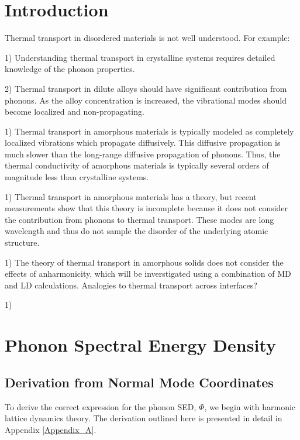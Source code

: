 \documentclass[letterpaper,12pt]{article}
\begin{document}
\section{\label{Section_Introduction}Introduction}

Thermal transport in disordered materials is not well understood.  For example:


1) Understanding thermal transport in crystalline systems requires detailed knowledge of the phonon properties.

2) Thermal transport in dilute alloys should have significant contribution from phonons.  As the alloy concentration is increased, the vibrational modes should become localized and non-propagating.

1) Thermal transport in amorphous materials is typically modeled as completely localized vibrations which propagate diffusively.  This diffusive propagation is much slower than the long-range diffusive propagation of phonons. Thus, the thermal conductivity of amorphous materials is typically several orders of magnitude less than crystalline systems.

1) Thermal transport in amorphous materials has a theory, but recent measurements show that this theory
is incomplete because it does not consider the contribution from phonons to thermal transport. These modes are long wavelength and thus do not sample the disorder of the underlying atomic structure.

1) The theory of thermal transport in amorphous solids does not consider the effects of anharmonicity, which will be inverstigated using a combination of MD and LD calculations. Analogies to thermal transport across interfaces?

1)

\section{\label{S:Section_NMD}Phonon Spectral Energy Density}

\subsection{\label{S:Subsection_NMD}Derivation from Normal Mode Coordinates}

To derive the correct expression for the phonon SED, $\Phi$, we begin with harmonic lattice dynamics theory.\cite{wallace1972,dove1993} The derivation outlined here is presented in detail in Appendix \ref{Appendix_A}.
\end{document}
